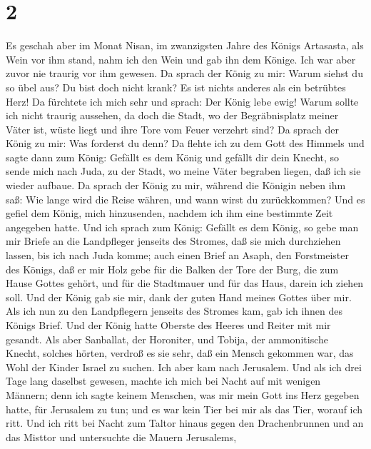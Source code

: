 \hypertarget{section-1}{%
\section{2}\label{section-1}}

 Es geschah aber im Monat Nisan, im zwanzigsten Jahre des
Königs Artasasta, als Wein vor ihm stand, nahm ich den Wein und gab ihn
dem Könige. Ich war aber zuvor nie traurig vor ihm gewesen.
 Da sprach der König zu mir: Warum siehst du so übel aus?
Du bist doch nicht krank? Es ist nichts anderes als ein betrübtes Herz!
 Da fürchtete ich mich sehr und sprach: Der König lebe
ewig! Warum sollte ich nicht traurig aussehen, da doch die Stadt, wo der
Begräbnisplatz meiner Väter ist, wüste liegt und ihre Tore vom Feuer
verzehrt sind?  Da sprach der König zu mir: Was forderst
du denn?  Da flehte ich zu dem Gott des Himmels und sagte
dann zum König: Gefällt es dem König und gefällt dir dein Knecht, so
sende mich nach Juda, zu der Stadt, wo meine Väter begraben liegen, daß
ich sie wieder aufbaue.  Da sprach der König zu mir,
während die Königin neben ihm saß: Wie lange wird die Reise währen, und
wann wirst du zurückkommen? Und es gefiel dem König, mich hinzusenden,
nachdem ich ihm eine bestimmte Zeit angegeben hatte.  Und
ich sprach zum König: Gefällt es dem König, so gebe man mir Briefe an
die Landpfleger jenseits des Stromes, daß sie mich durchziehen lassen,
bis ich nach Juda komme;  auch einen Brief an Asaph, den
Forstmeister des Königs, daß er mir Holz gebe für die Balken der Tore
der Burg, die zum Hause Gottes gehört, und für die Stadtmauer und für
das Haus, darein ich ziehen soll. Und der König gab sie mir, dank der
guten Hand meines Gottes über mir.  Als ich nun zu den
Landpflegern jenseits des Stromes kam, gab ich ihnen des Königs Brief.
Und der König hatte Oberste des Heeres und Reiter mit mir gesandt.
 Als aber Sanballat, der Horoniter, und Tobija, der
ammonitische Knecht, solches hörten, verdroß es sie sehr, daß ein Mensch
gekommen war, das Wohl der Kinder Israel zu suchen.  Ich
aber kam nach Jerusalem. Und als ich drei Tage lang daselbst gewesen,
 machte ich mich bei Nacht auf mit wenigen Männern; denn
ich sagte keinem Menschen, was mir mein Gott ins Herz gegeben hatte, für
Jerusalem zu tun; und es war kein Tier bei mir als das Tier, worauf ich
ritt.  Und ich ritt bei Nacht zum Taltor hinaus gegen den
Drachenbrunnen und an das Misttor und untersuchte die Mauern Jerusalems,
